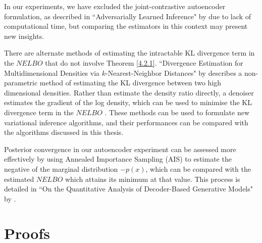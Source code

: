 \documentclass[honours,12pt]{unswthesis}
\numberwithin{equation}{section}
\theoremstyle{definition}
\begin{document}
In our experiments, we have excluded the joint-contrastive autoencoder formulation, as described in ``Adversarially Learned Inference" by \citet{ali} due to lack of computational time, but comparing the estimators in this context may present new insights.

There are alternate methods of estimating the intractable KL divergence term in the $NELBO$ that do not involve Theorem \ref{4.2.1}. ``Divergence Estimation for Multidimensional Densities via $k$-Nearest-Neighbor Distances" by \citet{wang} describes a non-parametric method of estimating the KL divergence between two high dimensional densities. Rather than estimate the density ratio directly, a denoiser estimates the gradient of the log density, which can be used to minimise the KL divergence term in the $NELBO$ \citep{vincent}. These methods can be used to formulate new variational inference algorithms, and their performances can be compared with the algorithms discussed in this thesis.

Posterior convergence in our autoencoder experiment can be assessed more effectively by using Annealed Importance Sampling (AIS) to estimate the negative of the marginal distribution $-p(x)$, which can be compared with the estimated $NELBO$ which attains its minimum at that value. This process is detailed in ``On the Quantitative Analysis of Decoder-Based Generative Models" by \citet{ais}.


\clearpage
{}





\newpage
\appendix
\chapter{Proofs}\label{app:A}
\end{document}
